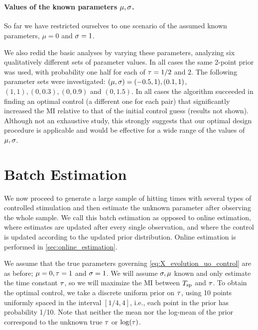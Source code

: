 \

\paragraph{Values of the known parameters $\mu, \sigma$.} 
So far we have restricted ourselves to one scenario of the assumed known
parameters, $\mu=0$ and $\sigma=1$. 

We also redid the basic analyses by varying these parameters, analyzing six
qualitatively different sets of parameter values. In all cases the same 2-point
prior was used, with probability one half for each of ${ \tau } = 1/2$ and $2$. The following
parameter sets were investigated: $(\mu,\sigma)=(-0.5, 1), (0.1,1)$, $(1,1), (0, 
0.3), (0, 0.9)$ and $(0,1.5)$. In all cases the algorithm succeeded in finding
an optimal control (a different one for each pair) that significantly increased the
MI relative to that of the initial control guess (results not
shown). Although not an exhaustive study, this strongly suggests that our
optimal design procedure is applicable and would be effective for a wide range
of the values of ${\mu },\sigma$.  

\clearpage

\section{Batch Estimation}
\label{sec:batch_estimation}
We now proceed to generate a large sample of hitting times with several types
of controlled stimulation and then estimate the unknown
parameter after observing the whole sample. We call this batch estimation as opposed to
online estimation, where estimates are updated after every single
observation, and where the control is updated according to the updated prior distribution.
Online estimation is performed in \cref{sec:online_estimation}.
 
We assume that the true parameters governing \cref{eq:X_evolution_uo_control}
are as before; $ {\mu } = 0, { \tau } = 1$ and $ \sigma = 1$. We will assume $\sigma, {\mu }$
known and only estimate the time constant ${ \tau }$, so
we will maximize the MI between ${ T_{\textrm{sp} } }$ and ${ \tau }$. To
obtain the optimal control, we take a discrete uniform prior on 
 ${ \tau }$, using 10 points uniformly spaced in the interval $[1/4, 4]$, i.e.,
 each point in the prior has probability 1/10. Note that neither the mean nor the
 log-mean of the prior correspond to the unknown true ${ \tau }$ or $\log({ \tau })$.
 
